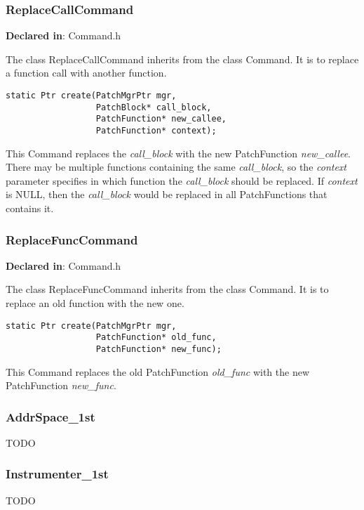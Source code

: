\subsubsection{ReplaceCallCommand}
\label{sec-3.3.4}

\textbf{Declared in}: Command.h

The class ReplaceCallCommand inherits from the class Command. It is to replace a
function call with another function.


\begin{verbatim}
static Ptr create(PatchMgrPtr mgr,
                  PatchBlock* call_block,
                  PatchFunction* new_callee,
                  PatchFunction* context);

\end{verbatim}



This Command replaces the \emph{call\_block} with the new PatchFunction
\emph{new\_callee}. There may be multiple functions containing the same
\emph{call\_block}, so the \emph{context} parameter specifies in which function the
\emph{call\_block} should be replaced. If \emph{context} is NULL, then the \emph{call\_block}
would be replaced in all PatchFunctions that contains it.

\subsubsection{ReplaceFuncCommand}
\label{sec-3.3.5}

\textbf{Declared in}: Command.h

The class ReplaceFuncCommand inherits from the class Command. It is to replace
an old function with the new one.


\begin{verbatim}
static Ptr create(PatchMgrPtr mgr,
                  PatchFunction* old_func,
                  PatchFunction* new_func);

\end{verbatim}



This Command replaces the old PatchFunction \emph{old\_func} with the new
PatchFunction \emph{new\_func}.

\subsubsection{AddrSpace\_1st}
\label{sec-3.3.6}


TODO

\subsubsection{Instrumenter\_1st}
\label{sec-3.3.7}


TODO
